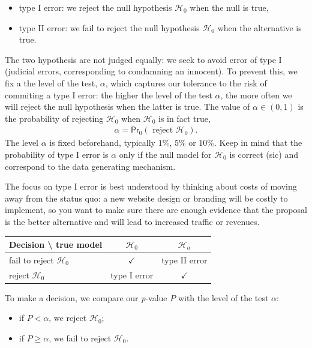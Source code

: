 \documentclass[
  11pt,
  letterpaper,
]{scrbook}
\providecommand{\tightlist}{%
  \setlength{\itemsep}{0pt}\setlength{\parskip}{0pt}}\usepackage{longtable,booktabs,array}
\theoremstyle{definition}
\theoremstyle{definition}
\theoremstyle{remark}
\begin{document}
\begin{itemize}
\tightlist
\item
  type I error: we reject the null hypothesis \(\mathscr{H}_0\) when the
  null is true,
\item
  type II error: we fail to reject the null hypothesis \(\mathscr{H}_0\)
  when the alternative is true.
\end{itemize}

The two hypothesis are not judged equally: we seek to avoid error of
type I (judicial errors, corresponding to condamning an innocent). To
prevent this, we fix a the level of the test, \(\alpha\), which captures
our tolerance to the risk of commiting a type I error: the higher the
level of the test \(\alpha\), the more often we will reject the null
hypothesis when the latter is true. The value of \(\alpha \in (0, 1)\)
is the probability of rejecting \(\mathscr{H}_0\) when \(\mathscr{H}_0\)
is in fact true, \begin{align*}
\alpha = \mathsf{Pr}_0\left(\text{ reject } \mathscr{H}_0\right).
\end{align*} The level \(\alpha\) is fixed beforehand, typically
\(1\)\%, \(5\)\% or \(10\)\%. Keep in mind that the probability of type
I error is \(\alpha\) only if the null model for \(\mathscr{H}_0\) is
correct (sic) and correspond to the data generating mechanism.

The focus on type I error is best understood by thinking about costs of
moving away from the status quo: a new website design or branding will
be costly to implement, so you want to make sure there are enough
evidence that the proposal is the better alternative and will lead to
increased traffic or revenues.

\begin{longtable}[]{@{}lcc@{}}
\toprule\noalign{}
\textbf{Decision} \textbackslash{} \textbf{true model} &
\(\mathscr{H}_0\) & \(\mathscr{H}_a\) \\
\midrule\noalign{}
\endhead
\bottomrule\noalign{}
\endlastfoot
fail to reject \(\mathscr{H}_0\) & \(\checkmark\) & type II error \\
reject \(\mathscr{H}_0\) & type I error & \(\checkmark\) \\
\end{longtable}

To make a decision, we compare our \emph{p}-value \(P\) with the level
of the test \(\alpha\):

\begin{itemize}
\tightlist
\item
  if \(P < \alpha\), we reject \(\mathscr{H}_0\);
\item
  if \(P \geq \alpha\), we fail to reject \(\mathscr{H}_0\).
\end{itemize}
\end{document}
